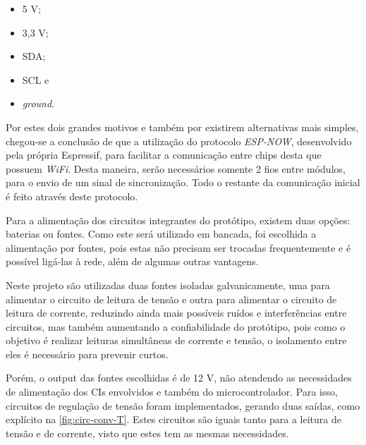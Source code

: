 \begin{itemize}
    \item 5 V;
    \item 3,3 V;
    \item SDA;
    \item SCL e
    \item \textit{ground}.
\end{itemize}

Por estes dois grandes motivos e também por existirem alternativas mais simples, chegou-se a conclusão de que a utilização do protocolo \textit{ESP-NOW}, desenvolvido pela própria Espressif, para facilitar a comunicação entre chips desta que possuem \textit{WiFi}. Desta maneira, serão necessários somente 2 fios entre módulos, para o envio de um sinal de sincronização. Todo o restante da comunicação inicial é feito através deste protocolo.

Para a alimentação dos circuitos integrantes do protótipo, existem duas opções: baterias ou fontes. Como este será utilizado em bancada, foi escolhida a alimentação por fontes, pois estas não precisam ser trocadas frequentemente e é possível ligá-las à rede, além de algumas outras vantagens.

Neste projeto são utilizadas duas fontes isoladas galvanicamente, uma para alimentar o circuito de leitura de tensão e outra para alimentar o circuito de leitura de corrente, reduzindo ainda mais possíveis ruídos e interferências entre circuitos, mas também aumentando a confiabilidade do protótipo, pois como o objetivo é realizar leituras simultâneas de corrente e tensão, o isolamento entre eles é necessário para prevenir curtos.

Porém, o output das fontes escolhidas é de 12 V, não atendendo as necessidades de alimentação dos \gls{CI}s envolvidos e também do microcontrolador. Para isso, circuitos de regulação de tensão foram implementados, gerando duas saídas, como explícito na \autoref{fig:circ-conv-T}. Estes circuitos são iguais tanto para a leitura de tensão e de corrente, visto que estes tem as mesmas necessidades.

